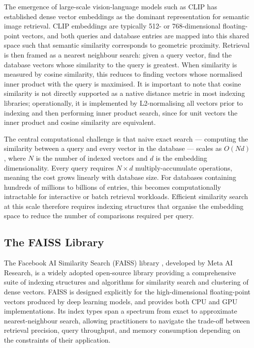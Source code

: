 The emergence of large-scale vision-language models such as CLIP 
\cite{Radford_2021_CLIP} has established dense vector embeddings as the 
dominant representation for semantic image retrieval. CLIP embeddings 
are typically 512- or 768-dimensional floating-point vectors, and both 
queries and database entries are mapped into this shared space such that 
semantic similarity corresponds to geometric proximity. Retrieval is 
then framed as a nearest neighbour search: given a query vector, find 
the database vectors whose similarity to the query is greatest. When 
similarity is measured by cosine similarity, this reduces to finding 
vectors whose normalised inner product with the query is maximised. It 
is important to note that cosine similarity is not directly supported 
as a native distance metric in most indexing libraries; operationally, 
it is implemented by L2-normalising all vectors prior to indexing and 
then performing inner product search, since for unit vectors the inner 
product and cosine similarity are equivalent.

The central computational challenge is that naive exact search --- 
computing the similarity between a query and every vector in the 
database --- scales as $O(Nd)$, where $N$ is the number of indexed 
vectors and $d$ is the embedding dimensionality. Every query requires 
$N \times d$ multiply-accumulate operations, meaning the cost grows 
linearly with database size. For databases containing hundreds of 
millions to billions of entries, this becomes computationally 
intractable for interactive or batch retrieval workloads. Efficient 
similarity search at this scale therefore requires indexing structures 
that organise the embedding space to reduce the number of comparisons 
required per query.

\subsection*{The FAISS Library}

The Facebook AI Similarity Search (FAISS) library 
\cite{Douze_2024_FAISS}, developed by Meta AI Research, is a widely 
adopted open-source library providing a comprehensive suite of indexing 
structures and algorithms for similarity search and clustering of dense 
vectors. FAISS is designed explicitly for the high-dimensional 
floating-point vectors produced by deep learning models, and provides 
both CPU and GPU implementations. Its index types span a spectrum from 
exact to approximate nearest-neighbour search, allowing practitioners 
to navigate the trade-off between retrieval precision, query 
throughput, and memory consumption depending on the constraints of 
their application.

